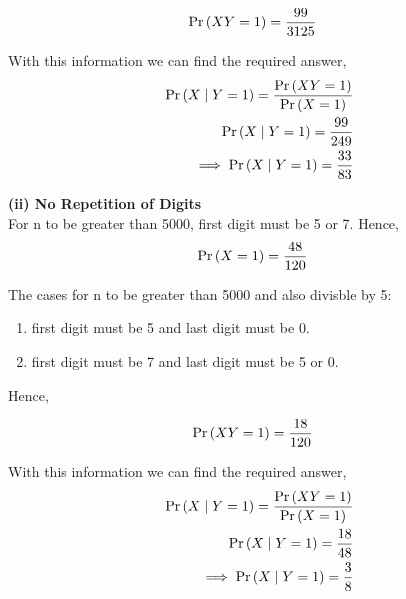 \documentclass{article}
\begin{document}
\begin{align}
	\Pr\left(XY=1\right) &=\frac{99}{3125}
\end{align}

With this information we can find the required answer,
\begin{align}
	\Pr\left(X \mid Y=1\right)=\frac{\Pr\left(XY=1\right) }{\Pr\left(X=1\right)}\\
	\Pr\left(X \mid Y=1\right)=\frac{99}{249}\\	
	\implies \Pr\left(X \mid Y=1\right)=\frac{33}{83}	
\end{align}


\textbf{(ii) No Repetition of Digits}\\
For n to be greater than 5000, first digit must be 5 or 7. Hence,
\begin{align}
	\Pr\left(X=1\right) &=\frac{48}{120}
\end{align}

The cases for n to be greater than 5000 and also divisble by 5:
\begin{enumerate}
\item first digit must be 5 and last digit must be 0.
\item first digit must be 7 and last digit must be 5 or 0.
\end{enumerate}
Hence,

\begin{align}
	\Pr\left(XY=1\right) &=\frac{18}{120}
\end{align}

With this information we can find the required answer,
\begin{align}
	\Pr\left(X \mid Y=1\right)=\frac{\Pr\left(XY=1\right) }{\Pr\left(X=1\right)}\\
	\Pr\left(X \mid Y=1\right)=\frac{18}{48}\\	
	\implies \Pr\left(X \mid Y=1\right)=\frac{3}{8}	
\end{align}
\end{document}
